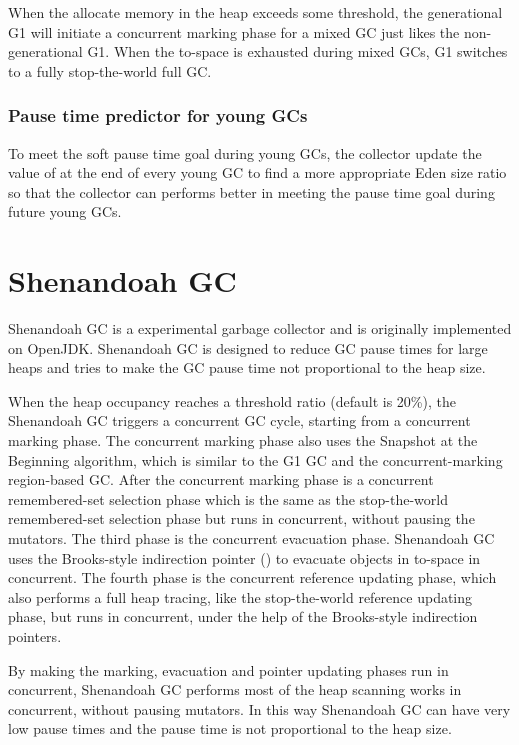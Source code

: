 When the allocate memory in the heap exceeds some threshold, the generational G1 will
initiate a concurrent marking phase for a mixed GC just likes the non-generational G1.
When the to-space is exhausted during mixed GCs, G1 switches to a fully stop-the-world full GC.

\subsubsection{Pause time predictor for young GCs}

To meet the soft pause time goal during young GCs, the collector update the value of 
at the end of every young GC to find a more appropriate Eden size ratio so that
the collector can performs better in meeting the pause time goal during future young GCs.
 
\section{Shenandoah GC}
\label{sec:shenandoahgc}

Shenandoah GC is a experimental garbage collector and is originally implemented on OpenJDK.
Shenandoah GC is designed to reduce GC pause times for large heaps and tries to make the GC pause
time not proportional to the heap size.
 
When the heap occupancy reaches a threshold ratio (default is 20\%), the Shenandoah GC triggers
a concurrent GC cycle, starting from a concurrent marking phase.
The concurrent marking phase also uses the Snapshot at the Beginning algorithm,
which is similar to the G1 GC and the concurrent-marking region-based GC.
After the concurrent marking phase is a concurrent remembered-set selection phase
which is the same as the stop-the-world remembered-set selection phase
but runs in concurrent, without pausing the mutators.
The third phase is the concurrent evacuation phase. Shenandoah GC uses the Brooks-style
indirection pointer (\cite{flood2016shenandoah}) to evacuate objects in to-space
in concurrent. The fourth phase is the concurrent reference updating phase, which
also performs a full heap tracing, like the stop-the-world reference updating phase,
but runs in concurrent, under the help of the Brooks-style indirection pointers.

By making the marking, evacuation and pointer updating phases run in concurrent, Shenandoah GC performs
most of the heap scanning works in concurrent, without pausing mutators. In this way
Shenandoah GC can have very low pause times and the pause time is not proportional
to the heap size.

